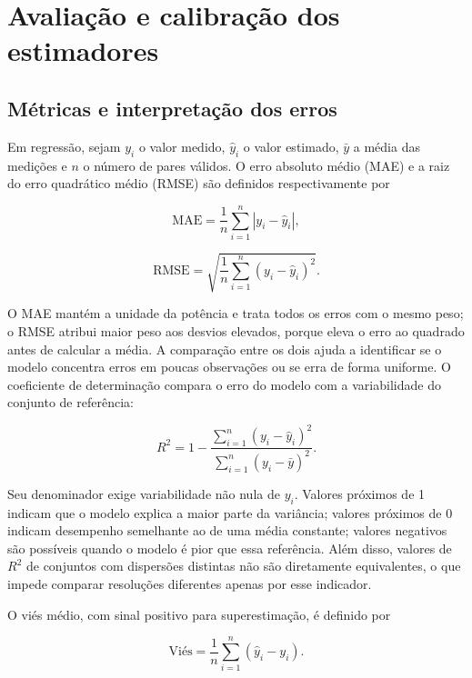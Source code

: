 \section{Avaliação e calibração dos estimadores}
\label{sec:ft-avaliacao}

\subsection{Métricas e interpretação dos erros}
\label{subsec:ft-metricas}

Em regressão, sejam $y_i$ o valor medido, $\hat y_i$ o valor estimado,
$\bar y$ a média das medições e $n$ o número de pares válidos. O erro
absoluto médio (MAE) e a raiz do erro quadrático médio (RMSE) são
definidos respectivamente por

\begin{equation}
\label{eq:mae}
\mathrm{MAE}=\frac{1}{n}\sum_{i=1}^{n}|y_i-\hat y_i|,
\end{equation}

\begin{equation}
\label{eq:rmse}
\mathrm{RMSE}=\sqrt{\frac{1}{n}\sum_{i=1}^{n}(y_i-\hat y_i)^2}.
\end{equation}

O MAE mantém a unidade da potência e trata todos os erros com o mesmo
peso; o RMSE atribui maior peso aos desvios elevados, porque eleva o
erro ao quadrado antes de calcular a média. A comparação entre os dois
ajuda a identificar se o modelo concentra erros em poucas observações ou
se erra de forma uniforme. O coeficiente de determinação compara o erro
do modelo com a variabilidade do conjunto de referência:

\begin{equation}
\label{eq:r2}
R^2=1-\frac{\sum_{i=1}^{n}(y_i-\hat y_i)^2}
{\sum_{i=1}^{n}(y_i-\bar y)^2}.
\end{equation}

Seu denominador exige variabilidade não nula de $y_i$. Valores próximos
de 1 indicam que o modelo explica a maior parte da variância; valores
próximos de 0 indicam desempenho semelhante ao de uma média constante;
valores negativos são possíveis quando o modelo é pior que essa
referência. Além disso, valores de $R^2$ de conjuntos com dispersões
distintas não são diretamente equivalentes, o que impede comparar
resoluções diferentes apenas por esse indicador.

O viés médio, com sinal positivo para superestimação,
é definido por

\begin{equation}
\label{eq:vies}
\text{Viés}=\frac{1}{n}
\sum_{i=1}^{n}(\hat y_i-y_i).
\end{equation}

